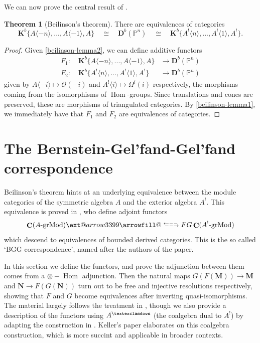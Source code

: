 \documentclass[a4paper]{article}
\makeatletter
\theoremstyle{definition}
\newtheorem{theorem}[defn]{Theorem}
\theoremstyle{remark}
\newcommand{\leftrarrows}{\mathrel{\raise.75ex\hbox{\oalign{%
  $\scriptstyle\leftarrow$\cr
  \vrule width0pt height.5ex$\hfil\scriptstyle\relbar$\cr}}}}
\newcommand{\lrightarrows}{\mathrel{\raise.75ex\hbox{\oalign{%
  $\scriptstyle\relbar$\hfil\cr
  $\scriptstyle\vrule width0pt height.5ex\smash\rightarrow$\cr}}}}
\newcommand{\Rrelbar}{\mathrel{\raise.75ex\hbox{\oalign{%
  $\scriptstyle\relbar$\cr
  \vrule width0pt height.5ex$\scriptstyle\relbar$}}}}
\def\leftrightarrowsfill@{\arrowfill@\leftrarrows\Rrelbar\lrightarrows}
\newcommand{\xleftrightarrows}[2][]{\ext@arrow 3399\leftrightarrowsfill@{#1}{#2}}
\newcommand{\grMod}{\ensuremath{\text{-grMod}}}
\DeclareMathOperator{\Hom}{\text{Hom}}
\DeclareMathOperator{\Ch}{\mathbf{C}}
\newcommand{\deri}{\mathbf{D}}
\newcommand{\Pn}{\ensuremath{{\mathbb{P}^n}}}
\newcommand{\gnab}{{\textexclamdown}}
\makeatother
\begin{document}
We can now prove the central result of .

\begin{theorem}[Beilinson's theorem]\label{beilinsonsthm}
    There are equivalences of categories
    \[ \mathbf{K}^b\{A\langle -n\rangle,...,A\langle -1\rangle, A\} \quad \cong
    \quad \deri^b(\Pn) \quad \cong \quad    \mathbf{K}^b\{A^!\langle
    n\rangle,...,A^!\langle 1\rangle, A^!\}. \]
    \begin{proof} 
        Given \cref{beilinson-lemma2}, we can define additive functors 
\begin{align*}
    F_1 : \quad \mathbf{K}^b\{A\langle -n\rangle,...,A\langle -1\rangle, A\}
    &\longrightarrow \deri^b(\Pn) \\ 
    F_2 : \quad \mathbf{K}^b\{A^!\langle n\rangle,...,A^!\langle 1\rangle, A^!\}
    &\longrightarrow \deri^b(\Pn) 
\end{align*}
given by \(A\langle -i \rangle \mapsto \mathscr{O}(-i)\) and \(A^!\langle i
\rangle \mapsto \Omega^i(i)\) respectively, the morphisms coming from the
isomorphisms of \(\Hom\)-groups. Since translations and cones are preserved,
these are morphisms of triangulated categories. By \cref{beilinson-lemma1}, we
immediately have that \(F_1\) and \(F_2\) are equivalences of categories.
    \end{proof}
\end{theorem}

\section{The Bernstein-Gel'fand-Gel'fand correspondence}\label{sec-BGG}

Beilinson's theorem hints at an underlying equivalence between the module
categories of the symmetric algebra \(A\) and the exterior algebra \(A^!\). This
equivalence is proved in , who define
adjoint functors 
\[\Ch(A\grMod) \xleftrightarrows[F]{G} \Ch(A^!\grMod)\]
which descend to equivalences of bounded derived categories. This is the so
called `BGG correspondence', named after the authors of the paper. 

In this section we define the functors, and prove the adjunction between them
comes from a \(\otimes -\Hom\) adjunction. Then the natural maps
\(G(F(\mathbf{M}))\rightarrow \mathbf{M}\) and \(\mathbf{N}\rightarrow
F(G(\mathbf{N}))\) turn out to be free and injective resolutions respectively,
showing that \(F\) and \(G\) become equivalences after inverting
quasi-isomorphisms. The material largely follows the treatment in
, though we also provide a description of the
functors using \(A^\gnab\) (the coalgebra dual to \(A^!\)) by adapting the
construction in . Keller's paper elaborates on
this coalgebra construction, which is more succint and applicable in broader
contexts.
\end{document}
